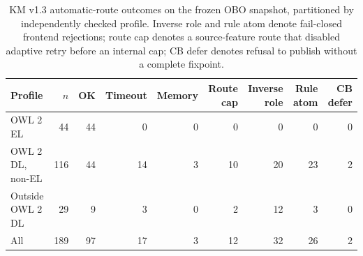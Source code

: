 \begin{table}[t]
\centering
\small
\setlength{\tabcolsep}{4pt}
\caption{KM v1.3 automatic-route outcomes on the frozen OBO snapshot, partitioned by independently checked profile.  Inverse role and rule atom denote fail-closed frontend rejections; route cap denotes a source-feature route that disabled adaptive retry before an internal cap; CB defer denotes refusal to publish without a complete fixpoint.}
\label{tab:km-obo-causes}
\begin{tabular}{lrrrrrrrr}
\toprule
Profile & $n$ & OK & Timeout & Memory & Route cap & Inverse role & Rule atom & CB defer \\
\midrule
OWL 2 EL & 44 & 44 & 0 & 0 & 0 & 0 & 0 & 0 \\
OWL 2 DL, non-EL & 116 & 44 & 14 & 3 & 10 & 20 & 23 & 2 \\
Outside OWL 2 DL & 29 & 9 & 3 & 0 & 2 & 12 & 3 & 0 \\
\midrule
All & 189 & 97 & 17 & 3 & 12 & 32 & 26 & 2 \\
\bottomrule
\end{tabular}
\end{table}
